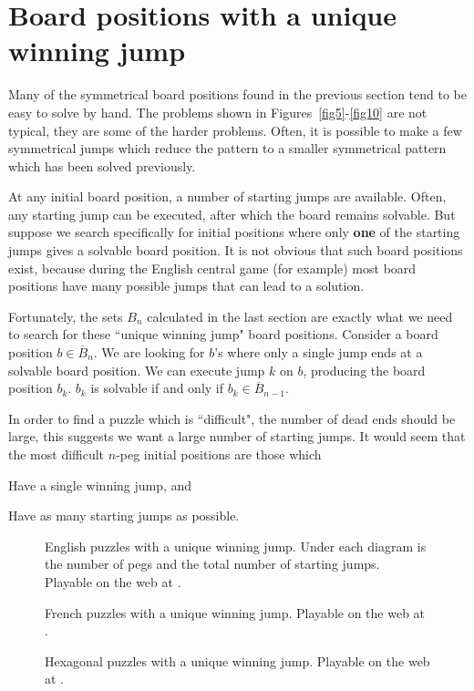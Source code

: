 \documentclass[12pt,reqno]{article}
\newenvironment{packed_enumerate}{
\setlength{\parsep}{0pt}
\setlength{\parskip}{0pt}
\begin{enumerate}
  \setlength{\itemsep}{1pt}
  \setlength{\parsep}{0pt}
  \setlength{\parskip}{0pt}
}{\end{enumerate}}
\begin{document}
\section{Board positions with a unique winning jump}
\label{sec:unique}

Many of the symmetrical board positions found in the previous section tend to be easy to solve by hand.
The problems shown in Figures~\ref{fig5}-\ref{fig10} are not typical, they are some of the harder problems.
Often, it is possible to make a few symmetrical jumps which reduce the pattern to a smaller symmetrical pattern
which has been solved previously.

At any initial board position, a number of starting jumps are available.
Often, any starting jump can be executed, after which the board remains solvable.
But suppose we search specifically for initial positions where only {\bf one} of the starting jumps
gives a solvable board position.
It is not obvious that such board positions exist,
because during the English central game (for example)
most board positions have many possible jumps that can lead to a solution.

Fortunately, the sets $B_n$ calculated in the last section are exactly what we need to search for these
``unique winning jump" board positions.
Consider a board position $b\in \overline{B}_n$.
We are looking for $b$'s where only a single jump ends at a solvable board position.
We can execute jump $k$ on $b$, producing the board position $b_k$.
$b_k$ is solvable if and only if $b_k\in \overline{B}_{n-1}$.

In order to find a puzzle which is ``difficult",
the number of dead ends should be large,
this suggests we want a large number of starting jumps.
It would seem that the most difficult $n$-peg initial positions are those which
\begin{packed_enumerate}
\item{Have a single winning jump, and}
\item{Have as many starting jumps as possible.}
\end{packed_enumerate}

\begin{figure}[htb]
\centering
{}
\caption{English puzzles with a unique winning jump.
Under each diagram is the number of pegs and the total number of starting jumps.
Playable on the web at \cite{BellDifEng}.}
\label{fig7}
\end{figure}
\begin{figure}[htb]
\centering
{}
\caption{French puzzles with a unique winning jump.
Playable on the web at \cite{BellDifFr}.}
\label{fig8}
\end{figure}
\begin{figure}[htb]
\centering
{}
\caption{Hexagonal puzzles with a unique winning jump.
Playable on the web at \cite{BellDifHex}.}
\label{fig9}
\end{figure}
\end{document}
